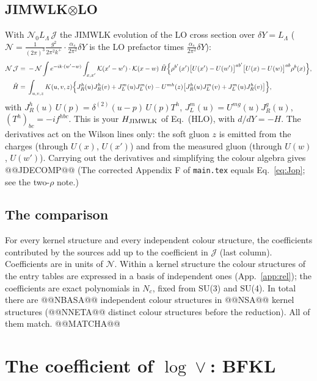 \documentclass[10pt]{article}
\numberwithin{equation}{section}
\newcommand{\KK}{\mathcal K}
\newcommand{\NN}{\mathcal N}
\newcommand{\NO}{\mathcal N_0}
\newcommand{\LL}{L_\Lambda}
\newcommand{\J}{\mathcal J}
\begin{document}
\subsection{JIMWLK\texorpdfstring{$\otimes$}{x}LO}\label{sec:Jop}
With $\NO\LL\,\J$ the JIMWLK evolution of the LO cross section over $\delta Y=\LL$ ($\NN=\frac{1}{(2\pi)^3}\frac{g^2}{2\pi^2k^+}\cdot\frac{\alpha_s}{2\pi^2}\delta Y$ is the LO prefactor times $\frac{\alpha_s}{2\pi^2}\delta Y$):
\begin{align}
\NN\,\J={}&-\NN\int e^{-ik\cdot(w'-w)}\int_{x,x'}\KK(x'-w')\cdot\KK(x-w)\;\tilde H\Big\{\rho^{b'}(x')\big[U(x')-U(w')\big]^{ab'}\big[U(x)-U(w)\big]^{ab}\rho^b(x)\Big\},\notag\\
\tilde H={}&\int_{u,v,z}K(u,v,z)\Big\{J_R^h(u)J_R^h(v)+J_L^m(u)J_L^m(v)-U^{mh}(z)\big[J_R^h(u)J_L^m(v)+J_L^m(u)J_R^h(v)\big]\Big\},
\label{eq:Jop}
\end{align}
with $J_R^h(u)\,U(p)=\delta^{(2)}(u-p)\,U(p)T^h$, $J_L^m(u)=U^{mg}(u)J_R^g(u)$, $(T^h)_{bc}=-if^{hbc}$. This is your $H_{\rm JIMWLK}$ of Eq.~(HLO), with $d/dY=-H$. The derivatives act on the Wilson lines only: the soft gluon $z$ is emitted from the charges (through $U(x)$, $U(x')$) and from the measured gluon (through $U(w)$, $U(w')$). Carrying out the derivatives and simplifying the colour algebra gives
@@JDECOMP@@
(The corrected Appendix F of \texttt{main.tex} equals Eq.~\eqref{eq:Jop}; see the two-$\rho$ note.)

\subsection{The comparison}\label{sec:Jmatch}
For every kernel structure and every independent colour structure, the coefficients contributed by the sources add up to the coefficient in $\J$ (last column). Coefficients are in units of $\NN$. Within a kernel structure the colour structures of the entry tables are expressed in a basis of independent ones (App.~\ref{app:rel}); the coefficients are exact polynomials in $N_c$, fixed from SU(3) and SU(4). In total there are @@NBASA@@ independent colour structures in @@NSA@@ kernel structures (@@NNETA@@ distinct colour structures before the reduction). All of them match.
@@MATCHA@@

\section{The coefficient of \texorpdfstring{$\log\vee$}{log vee}: BFKL}\label{sec:P}
\end{document}
